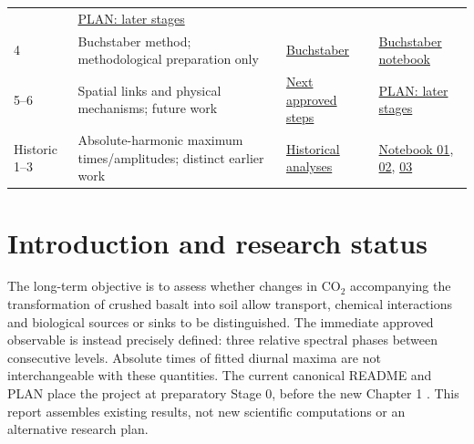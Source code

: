 \documentclass[11pt,letterpaper]{article}
\begin{document}
\begin{longtable}{@{}p{1.28cm}p{4.0cm}p{3.35cm}p{5.05cm}@{}}
& \href{https://github.com/DimitriBolt/CO2Flux/blob/main/Project_description/Research_log/PLAN.md#later}{PLAN: later stages}\\
4 & Buchstaber method; methodological preparation only
& \hyperref[sec:buchstaber]{Buchstaber}
& \href{https://github.com/DimitriBolt/CO2Flux/blob/main/Project_description/Research_log/04_buchstaber.ipynb}{Buchstaber notebook}\\
5--6 & Spatial links and physical mechanisms; future work
& \hyperref[sec:next]{Next approved steps}
& \href{https://github.com/DimitriBolt/CO2Flux/blob/main/Project_description/Research_log/PLAN.md#later}{PLAN: later stages}\\
Historic 1--3 & Absolute-harmonic maximum times/amplitudes; distinct earlier work
& \hyperref[sec:historical]{Historical analyses}
& \href{https://github.com/DimitriBolt/CO2Flux/blob/main/Project_description/Research_log/01_october_2017.ipynb}{Notebook 01},
\href{https://github.com/DimitriBolt/CO2Flux/blob/main/Project_description/Research_log/02_monthly_changes.ipynb}{02},
\href{https://github.com/DimitriBolt/CO2Flux/blob/main/Project_description/Research_log/03_long_term_evolution.ipynb}{03}\\
\bottomrule
\end{longtable}
\endgroup
\clearpage
\newpage
\section{Introduction and research status}
\label{sec:intro}
The long-term objective is to assess whether changes in CO$_2$ accompanying the transformation of crushed basalt into soil allow transport, chemical interactions and biological sources or sinks to be distinguished. The immediate approved observable is instead precisely defined: three relative spectral phases between consecutive levels. Absolute times of fitted diurnal maxima are not interchangeable with these quantities. The current canonical README and PLAN place the project at preparatory Stage 0, before the new Chapter 1 \cite{readme,plan}. This report assembles existing results, not new scientific computations or an alternative research plan.
\end{document}
